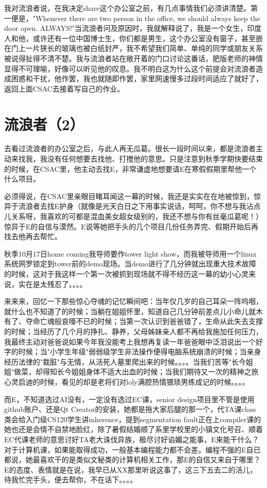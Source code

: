\documentclass[12pt]{book}
\begin{document}
我对流浪者说，在我决定share这个办公室之前，有几点事情我们必须讲清楚。第一便是，"Whenever there are two person in the office, we should always keep the door open. ALWAYS!"当流浪者问及原因时，我就解释说了，我是一个女生，印度人和他，或许还有一位中国博士生，你们都是男生，这个办公室没有窗子，甚至嵌在门上一片狭长的玻璃也被白纸封严，我不希望我们简单、单纯的同学或朋友关系被说得扯得不清不楚。我与流浪者站在敞开着的门口讨论这番话，肥版老师的神情显得不可理喻，好像可以听见他的叹息。我不明白这为什么这个前提会对流浪者造成困惑和干扰，他作罢，我也就随即作罢，家里网速慢多过段时间适应了就好了，返回上面CSAC去接着写自己的作业。
\section{流浪者（2）}
\label{sec-39-2}
去看过流浪者的办公室之后，与此人再无瓜葛。很长一段时间以来，都是流浪者主动来找我，我没有任何想要去找他、打搅他的意思。只是注意到秋季学期快要结束的时候，在CSAC里，他主动去找E，非常谦虚地想要请E在寒假假期里帮他一个什么项目。

必须得说，在CSAC里亲眼目睹耳闻这一幕的时候，我还是实实在在地被惊到，惊异于流浪者去找E护身（就像是光天白日之下用事实说话，呵呵，你不想与我沾点儿关系呀，我喜欢的可都是混血美女超女级别的，我还不想与你有丝毫瓜葛呢！）惊异于E的自信与漠然。E说等她把手头的几个项目几份任务弄完、假期开始后再找去他再去帮忙。

秋季10月17日home coming我导师要作tower light show，而我被导师用一个linux系统网罗锁定到tower前的demo现场。当demo进行了几分钟就出现重大技术故障的时候，这对于我这样一个第一次被抓到现场就不得不经历这一幕的幼小心灵来说，实在是太残忍了。。。。

来来来，回忆一下那些惊心夺魂的记忆瞬间吧：当年仅几岁的自己耳朵一阵呜咽，就什么也不知道了的时候；当躺在姐姐怀里，知道自己几分钟前差点儿小命儿就木有了、夺命亡魂般哀嚎不已的时候；当第一次认识到爸爸错了，生命从此失去支撑的时候；当经历了几个月的挣扎、静养，父母姊妹亲人都不再给我施加任何压力，我最终主动对爸爸说如果今年我没能考上我想再复读一年爸爸眼中泛泪说出一个好字的时候；当"小学生年级"弱弱级学生非法操作便得电脑系统崩溃的时候；当亲身经历法律的"栽脏"与无情，从活死人墓里爬出来的时候。。。。当我们苦等"长今姐姐"做菜，却得知长今姐姐身体不适大出血的时候；当我们期待又一次的精神之旅心灵启迪的时候，看见的却是老将们对loly满腔热情猥琐男练成记的时候。。。。

而E，不知道选过AI没有，一定没有选过EC课，senior design项目里不管是使用github账户、还是Qt Creator的安装，她都是拖大家后腿的那一个，代TA课class类会给入门级CS120学生讲inherence，提到segmentation fault正在上compiler课的她也还是会情不自禁地脸红，除了暑假结婚顺了系里学校里的小镇文化号召、顺着EC代课老师的意思讨好TA老大诛伐异族，极尽讨好谄媚之能事，E来能干什么？对于计算机课，如果能取得成功，一般基本编程能力都不会差。编程不强的E自已都说，她最喜欢干的是类似文秘类的计算机相关工作，那E的自信又来自于哪里？E的态度、表情就是在说，我早已从XX那里听说这事了，这三下五去二的活儿，待我忙完手头，便去帮你，不在话下。。。。
\end{document}
